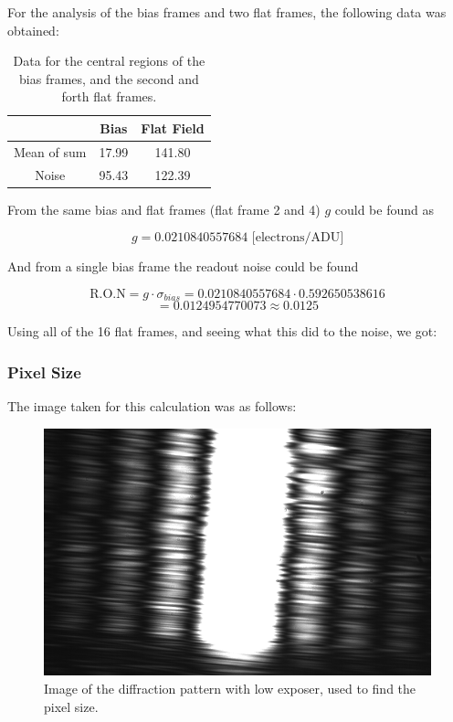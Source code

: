 \documentclass{emulateapj}
\begin{document}
For the analysis of the bias frames and two flat frames, the following data was obtained:

\begin{table}[H]
\centering
\begin{tabular}{c|c|c}
  & Bias & Flat Field \\
  \hline
Mean of sum & 17.99 & 141.80\\
Noise & 95.43 & 122.39
\end{tabular}
\caption{Data for the central regions of the bias frames, and the second and forth flat frames.}
\end{table}


From the same bias and flat frames (flat frame 2 and 4) $g$ could be found as

\begin{equation}
g = 0.0210840557684  \text{ [electrons/ADU]}
\label{eq:gVal}
\end{equation}

And from a single bias frame the readout noise could be found

\begin{equation}
\text{R.O.N} = g\cdot\sigma_{bias} = 0.0210840557684\cdot0.592650538616 
\end{equation}
\begin{equation}
= 0.0124954770073 \approx 0.0125
\end{equation}


Using all of the 16 flat frames, and seeing what this did to the noise, we got:



\subsubsection{Pixel Size}
\label{sec:resPixSize}

The image taken for this calculation was as follows:

\begin{figure}[H]
\centering
\includegraphics[scale=0.2]{3_1.png}
\caption{Image of the diffraction pattern with low exposer, used to find the pixel size.}
\label{img:rawPixSize}
\end{figure}
\end{document}
